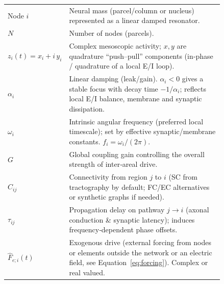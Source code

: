 \documentclass[12pt]{article}
\numberwithin{equation}{section}
\begin{document}
\begin{tcolorbox}[
  colback=gray!5,
  colframe=slate,
  colbacktitle=softblue!25,
  coltitle=softblue!60!black,
  fonttitle=\bfseries\small,
  title={\small  \textit{Coupled Damped oscillator (Eq.~\ref{eq:linear_damped_connectome})}\\ Whole-brain Simulations Parameters \& Physiological Meaning },
  boxrule=0.4pt, enhanced, sharp corners,
  left=4pt,right=4pt,top=3pt,bottom=3pt,
  boxsep=2pt, before skip=6pt, after skip=6pt
]
\scriptsize
\begin{tabular}{@{}l p{0.84\linewidth}@{}}
Node $i$ & Neural mass (parcel/column or nucleus) represented as a linear damped resonator.\\
\textbf{$N$} & Number of nodes (parcels).\\
\textbf{$z_i(t)=x_i+i\,y_i$} & Complex mesoscopic activity; $x,y$ are quadrature “push–pull” components (in‑phase / quadrature of a local E/I loop).\\
\textbf{$\alpha_i$} & Linear damping (leak/gain). $\alpha_i<0$ gives a stable focus with decay time $-\!1/\alpha_i$; reflects local E/I balance, membrane and synaptic dissipation.\\
\textbf{$\omega_i$} & Intrinsic angular frequency (preferred local timescale); set by effective synaptic/membrane constants. $f_i=\omega_i/(2\pi)$.\\
\textbf{$G$} & Global coupling gain controlling the overall strength of inter‑areal drive.\\
\textbf{$C_{ij}$} & Connectivity from region $j$ to $i$ (SC from tractography by default; FC/EC alternatives or synthetic graphs if needed).\\
\textbf{$\tau_{ij}$} & Propagation delay on pathway $j{\to}i$ (axonal conduction \& synaptic latency); induces frequency‑dependent phase offsets.\\
\textbf{$\hat F_{e;i}(t)$}& Exogenous drive  (external forcing from nodes or elements outside the network or an electric field, see Equation~\ref{eq:forcing}). Complex or real valued.
\end{tabular}
\end{tcolorbox}
\end{document}
